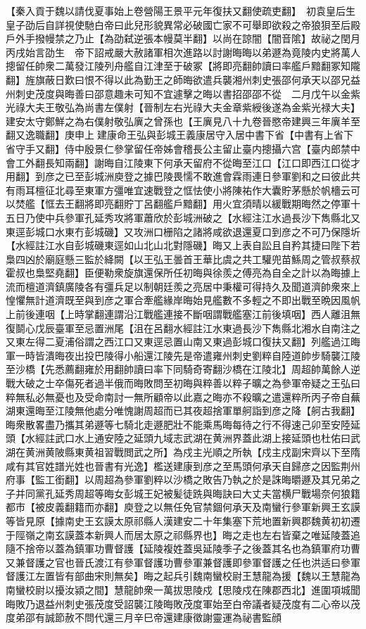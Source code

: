 【秦入貢于魏以請伐夏事始上卷營陽王景平元年復扶又翻使疏吏翻】　初袁皇后生皇子劭后自詳視使馳白帝曰此兒形貌異常必破國亡家不可舉即欲殺之帝狼狽至后殿戶外手撥幔禁之乃止【為劭弑逆張本幔莫半翻】以尚在諒闇【闇音隂】故祕之閏月丙戌始言劭生　帝下詔戒嚴大赦諸軍相次進路以討謝晦晦以弟遯為竟陵内史將萬人摠留任帥衆二萬發江陵列舟艦自江津至于破冢【將即亮翻帥讀曰率艦戶黯翻冢知隴翻】旌旗蔽日歎曰恨不得以此為勤王之師晦欲遣兵襲湘州刺史張邵何承天以邵兄益州刺史茂度與晦善曰邵意趣未可知不宜遽擊之晦以書招邵邵不從　二月戊午以金紫光祿大夫王敬弘為尚書左僕射【晉制左右光祿大夫金章紫綬後遂為金紫光禄大夫】建安太守鄭鮮之為右僕射敬弘廙之曾孫也【王廙見八十九卷晉愍帝建興三年廙羊至翻又逸職翻】庚申上建康命王弘與彭城王義康居守入居中書下省【中書有上省下省守手又翻】侍中殷景仁參掌留任帝姊會稽長公主留止臺内摠攝六宫【臺内郎禁中會工外翻長知兩翻】謝晦自江陵東下何承天留府不從晦至江口【江口即西江口從才用翻】到彦之已至彭城洲庾登之據巴陵畏懦不敢進會霖雨連日參軍劉和之曰彼此共有雨耳檀征北尋至東軍方彊唯宜速戰登之恇怯使小將陳祐作大囊貯茅懸於帆檣云可以焚艦【恇去王翻將即亮翻貯丁呂翻艦戶黯翻】用火宜須晴以緩戰期晦然之停軍十五日乃使中兵參軍孔延秀攻將軍蕭欣於彭城洲破之【水經注江水過長沙下雋縣北又東逕彭城口水東冇彭城磯】又攻洲口栅陷之諸將咸欲退還夏口到彦之不可乃保隱圻【水經註江水自彭城磯東逕如山北山北對隱磯】晦又上表自訟且自矜其捷曰陛下若梟四凶於廟庭懸三監於絳闕【以王弘王曇首王華比虞之共工驩兜苗鯀周之管叔蔡叔霍叔也梟堅堯翻】臣便勒衆旋旗還保所任初晦與徐羨之傅亮為自全之計以為晦據上流而檀道濟鎮廣陵各有彊兵足以制朝廷羨之亮居中秉權可得持久及聞道濟帥衆來上惶懼無計道濟既至與到彦之軍合牽艦緣岸晦始見艦數不多輕之不即出戰至晩因風帆上前後連咽【上時掌翻連謂沿江戰艦連接不斷咽謂戰艦塞江前後填咽】西人離沮無復鬬心戊辰臺軍至忌置洲尾【沮在呂翻水經註江水東過長沙下雋縣北湘水自南注之又東左得二夏浦俗謂之西江口又東逕忌置山南又東過彭城口復扶又翻】列艦過江晦軍一時皆潰晦夜出投巴陵得小船還江陵先是帝遣雍州刺史劉粹自陸道帥步騎襲江陵至沙橋【先悉薦翻雍於用翻帥讀曰率下同騎奇寄翻沙橋在江陵北】周超帥萬餘人逆戰大破之士卒傷死者過半俄而晦敗問至初晦與粹善以粹子曠之為參軍帝疑之王弘曰粹無私必無憂也及受命南討一無所顧帝以此嘉之晦亦不殺曠之遣還粹所丙子帝自蕪湖東還晦至江陵無他處分唯愧謝周超而已其夜超捨軍單舸詣到彦之降【舸古我翻】晦衆散畧盡乃攜其弟遯等七騎北走遯肥壯不能乘馬晦每待之行不得速己卯至安陸延頭【水經註武口水上通安陸之延頭九域志武湖在黄洲界蓋此湖上接延頭也杜佑曰武湖在黄洲黄陂縣東黄祖習戰閲武之所】為戍主光順之所執【戍主戍副宋齊以下至隋咸有其官姓譜光姓也晉書有光逸】檻送建康到彦之至馬頭何承天自歸彦之因監荆州府事【監工銜翻】以周超為參軍劉粹以沙橋之敗告乃執之於是誅晦㬭遯及其兄弟之子并同黨孔延秀周超等晦女彭城王妃被髪徒跣與晦訣曰大丈夫當横尸戰場奈何狼籍都市【被皮義翻籍而亦翻】庾登之以無任免官禁錮何承天及南蠻行參軍新興王玄謨等皆見原【據南史王玄謨太原祁縣人漢建安二十年集塞下荒地置新興郡魏黄初初遷于陘嶺之南玄謨蓋本新興人而居太原之祁縣界也】晦之走也左右皆棄之唯延陵蓋追隨不捨帝以蓋為鎮軍功曹督護【延陵複姓蓋吳延陵季子之後蓋其名也為鎮軍府功曹又兼督護之官也晉氏渡江有參軍督護功曹參軍兼督護即參軍督護之任也洪适曰參軍督護江左置皆有部曲宋則無矣】晦之起兵引魏南蠻校尉王慧龍為援【魏以王慧龍為南蠻校尉以擾汝潁之間】慧龍帥衆一萬拔思陵戍【思陵戍在陳郡西北】進圍項城聞晦敗乃退益州刺史張茂度受詔襲江陵晦敗茂度軍始至白帝議者疑茂度有二心帝以茂度弟邵有誠節赦不問代還三月辛巳帝還建康徵謝靈運為祕書監顔